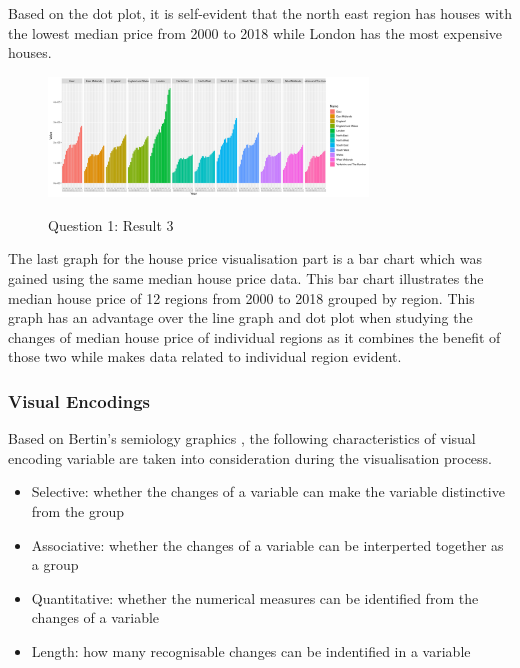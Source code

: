 \documentclass{article}
\begin{document}
Based on the dot plot, it is self-evident that the north east region has houses with the lowest median price 
from 2000 to 2018 while London has the most expensive houses.

\begin{figure}[H]
  \begin{minipage}[b]{1.0\linewidth}
    \centering
    \centerline{\includegraphics[width=8.5cm]{Q1Geom_gridbar}}
    \centerline{Question 1: Result 3}\medskip
  \end{minipage}
\end{figure}

The last graph for the house price visualisation part is a bar chart which was gained using the same median house price data. This bar chart illustrates the median house price of 12 regions from 2000 to 2018 
grouped by region. This graph has an advantage over the line graph and dot plot when studying the changes of median house price of individual regions as it combines the benefit of those two while makes data related to individual region evident.

\subsubsection{Visual Encodings}
Based on Bertin's semiology graphics \cite{BertinJacques}, the following characteristics of visual encoding variable are taken into consideration during the visualisation process. 

\begin{itemize}
  \item Selective:
        whether the changes of a variable can make the variable distinctive from the group
  \item Associative:
        whether the changes of a variable can be interperted together as a group
  \item Quantitative: 
        whether the numerical measures can be identified from the changes of a variable
  \item Length:
        how many recognisable changes can be indentified in a variable
\end{itemize}
\end{document}
